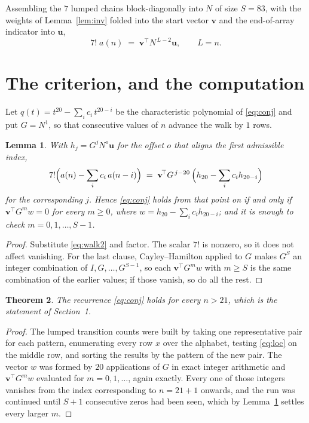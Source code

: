 \documentclass[11pt,a4paper]{article}
\theoremstyle{plain}
\newtheorem{theorem}{Theorem}
\newtheorem{lemma}[theorem]{Lemma}
\theoremstyle{definition}
\begin{document}
Assembling the $7$ lumped chains block-diagonally into $N$ of size $S=83$, with the
weights of Lemma~\ref{lem:inv} folded into the start vector $\mathbf{v}$ and the
end-of-array indicator into $\mathbf{u}$,
\begin{equation}\label{eq:walk2}
7!\;a(n)\;=\;\mathbf{v}^{\!\top}N^{\,L-2}\mathbf{u},\qquad L=n .
\end{equation}

\section{The criterion, and the computation}

Let $q(t)=t^{20}-\sum_i c_i\,t^{20-i}$ be the characteristic polynomial of
\eqref{eq:conj} and put $G=N^{1}$, so that consecutive values of $n$ advance the
walk by $1$ rows.

\begin{lemma}\label{lem:crit}
With $h_j=G^{j}N^{o}\mathbf{u}$ for the offset $o$ that aligns the first admissible
index,
\[
7!\Bigl(a(n)-\sum_i c_i\,a(n-i)\Bigr)\;=\;\mathbf{v}^{\!\top}G^{\,j-20}\,
\Bigl(h_{20}-\sum_i c_i h_{20-i}\Bigr)
\]
for the corresponding $j$. Hence \eqref{eq:conj} holds from that point on if and only if
$\mathbf{v}^{\!\top}G^{m}w=0$ for every $m\ge0$, where
$w=h_{20}-\sum_i c_ih_{20-i}$; and it is enough to check $m=0,1,\dots,S-1$.
\end{lemma}

\begin{proof}
Substitute \eqref{eq:walk2} and factor. The scalar $7!$ is nonzero, so it does not
affect vanishing. For the last clause, Cayley--Hamilton applied to $G$ makes $G^{S}$ an
integer combination of $I,G,\dots,G^{S-1}$, so each $\mathbf{v}^{\!\top}G^{m}w$ with
$m\ge S$ is the same combination of the earlier values; if those vanish, so do all the rest.
\end{proof}

\begin{theorem}
The recurrence \eqref{eq:conj} holds for every $n>21$, which is the statement of
Section~1.
\end{theorem}

\begin{proof}
The lumped transition counts were built by taking one representative pair for each pattern,
enumerating every row $x$ over the alphabet, testing \eqref{eq:loc} on the middle
row, and sorting the results by the pattern of the new pair. The vector $w$ was formed by
$20$ applications of $G$ in exact integer arithmetic and $\mathbf{v}^{\!\top}G^{m}w$
evaluated for $m=0,1,\dots$, again exactly. Every one of those integers vanishes from the
index corresponding to $n=21+1$ onwards, and the run was continued until $S+1$
consecutive zeros had been seen, which by Lemma~\ref{lem:crit} settles every larger $m$.
\end{proof}
\end{document}
